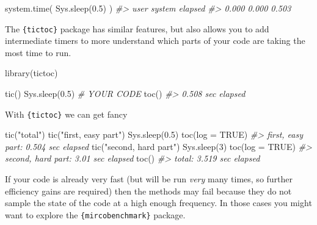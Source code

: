 \documentclass[
  12pt,
]{book}
\newenvironment{Shaded}{\begin{snugshade}}{\end{snugshade}}
\newcommand{\AttributeTok}[1]{\textcolor[rgb]{0.77,0.63,0.00}{#1}}
\newcommand{\CommentTok}[1]{\textcolor[rgb]{0.56,0.35,0.01}{\textit{#1}}}
\newcommand{\ConstantTok}[1]{\textcolor[rgb]{0.00,0.00,0.00}{#1}}
\newcommand{\DecValTok}[1]{\textcolor[rgb]{0.00,0.00,0.81}{#1}}
\newcommand{\FloatTok}[1]{\textcolor[rgb]{0.00,0.00,0.81}{#1}}
\newcommand{\FunctionTok}[1]{\textcolor[rgb]{0.00,0.00,0.00}{#1}}
\newcommand{\NormalTok}[1]{#1}
\newcommand{\StringTok}[1]{\textcolor[rgb]{0.31,0.60,0.02}{#1}}
\begin{document}
\begin{Shaded}
\begin{Highlighting}[]
\FunctionTok{system.time}\NormalTok{(}
  \FunctionTok{Sys.sleep}\NormalTok{(}\FloatTok{0.5}\NormalTok{)}
\NormalTok{)}
\CommentTok{\#\textgreater{}    user  system elapsed }
\CommentTok{\#\textgreater{}   0.000   0.000   0.503}
\end{Highlighting}
\end{Shaded}

The \texttt{\{tictoc\}} package has similar features, but also allows you to add intermediate timers to more understand which parts of your code are taking the most time to run.

\begin{Shaded}
\begin{Highlighting}[]
\FunctionTok{library}\NormalTok{(tictoc)}

\FunctionTok{tic}\NormalTok{() }
\FunctionTok{Sys.sleep}\NormalTok{(}\FloatTok{0.5}\NormalTok{) }\CommentTok{\# YOUR CODE }
\FunctionTok{toc}\NormalTok{()}
\CommentTok{\#\textgreater{} 0.508 sec elapsed}
\end{Highlighting}
\end{Shaded}

With \texttt{\{tictoc\}} we can get fancy

\begin{Shaded}
\begin{Highlighting}[]
\FunctionTok{tic}\NormalTok{(}\StringTok{"total"}\NormalTok{)}
\FunctionTok{tic}\NormalTok{(}\StringTok{"first, easy part"}\NormalTok{)}
\FunctionTok{Sys.sleep}\NormalTok{(}\FloatTok{0.5}\NormalTok{)}
\FunctionTok{toc}\NormalTok{(}\AttributeTok{log =} \ConstantTok{TRUE}\NormalTok{)}
\CommentTok{\#\textgreater{} first, easy part: 0.504 sec elapsed}
\FunctionTok{tic}\NormalTok{(}\StringTok{"second, hard part"}\NormalTok{)}
\FunctionTok{Sys.sleep}\NormalTok{(}\DecValTok{3}\NormalTok{)}
\FunctionTok{toc}\NormalTok{(}\AttributeTok{log =} \ConstantTok{TRUE}\NormalTok{)}
\CommentTok{\#\textgreater{} second, hard part: 3.01 sec elapsed}
\FunctionTok{toc}\NormalTok{()}
\CommentTok{\#\textgreater{} total: 3.519 sec elapsed}
\end{Highlighting}
\end{Shaded}

If your code is already very fast (but will be run \emph{very} many times, so further efficiency gains are required) then the methods may fail because they do not sample the state of the code at a high enough frequency. In those cases you might want to explore the \texttt{\{mircobenchmark\}} package.
\end{document}
